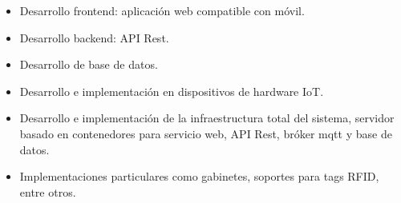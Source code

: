 \begin{itemize}
	\item Desarrollo frontend: aplicación web compatible con móvil.
	\item Desarrollo backend: API Rest.
	\item Desarrollo de base de datos.
	\item Desarrollo e implementación en dispositivos de hardware IoT.
	\item Desarrollo e implementación de la infraestructura total del sistema, servidor basado en contenedores para servicio web, API Rest, bróker mqtt y base de datos. 
	\item Implementaciones particulares como gabinetes, soportes para tags RFID, entre otros.                  
\end{itemize}
%
%
%
%
%
%
%
%
